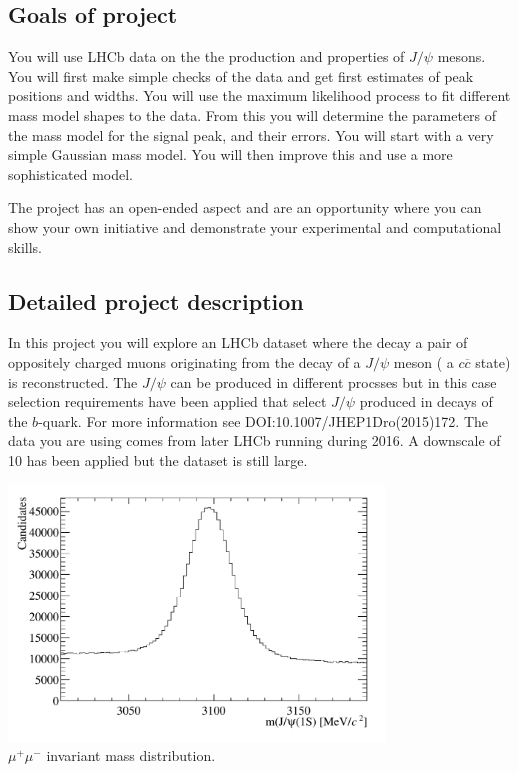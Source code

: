 \subsection{Goals of project}

You will use LHCb data on the the production and properties of $J/\psi$ mesons. You will first make simple checks of the data and get first estimates of peak positions and widths. You will use the maximum likelihood process to fit different mass model shapes to the data. From this you will determine the parameters of the mass model for the signal peak, and their errors. You will start with a very simple Gaussian mass model. You will then improve this and use a more sophisticated model.

The project has an open-ended aspect and are an opportunity where you can show your own initiative and demonstrate your experimental and computational skills. 




\subsection{Detailed project description}
 
In this project you will explore an LHCb dataset where the decay a pair of oppositely charged muons originating from the decay of a $J/\psi$ meson ( a $c\overline{c}$ state) is reconstructed. The $J/\psi$ can be produced in different procsses but in this case selection requirements have been applied that select $J/\psi$ produced in decays of the $b$-quark. For more information see  {DOI:10.1007/JHEP1Dro(2015)172}. The data you are using comes from later LHCb running during 2016. A downscale of 10 has been applied but the dataset is still large. 

%
\begin{center}
\includegraphics[width=0.75\textwidth]{figs/jpsi.pdf}\\
{\small $\mu^+ \mu^-$ invariant mass distribution.}
\end{center}
%

